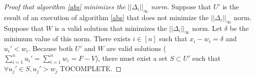 \begin{proof}[Proof that algorithm \ref{abs} minimizes the $||\Delta_i||_\infty$ norm]
   Suppose that $U'$ is the result of an execution of algorithm \ref{abs} that does not minimize the $||\Delta_i||_\infty$
   norm. Suppose that $W$ is a valid solution that minimizes the $||\Delta_i||_\infty$ norm. Let $\delta$ be the minimum
   value of this norm. There exists $i \in [n]$ such that $x_i - w_i = \delta$ and $u_i' < w_i$. Because both $U'$
   and $W$ are valid solutions ($\sum\limits_{i=1}^{n}u_i' = \sum\limits_{i=1}^{n}w_i = F - V$), there must exist a set
   $S \subset U'$ such that $\forall u_j' \in S, u_j' > w_j$ TOCOMPLETE.
\end{proof}
